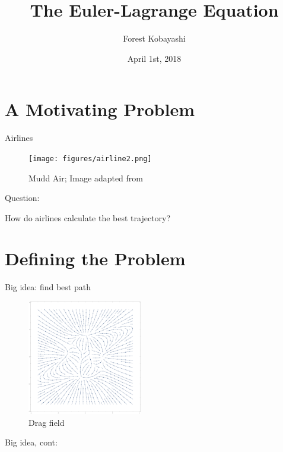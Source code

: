 \documentclass{fkpresentation}
\title{\textmd{The Euler-Lagrange Equation}}
\author{Forest Kobayashi}
\institute{Harvey Mudd College}
\date{April 1st, 2018}
\begin{document}
\frame{\titlepage}
\section{A Motivating Problem}

\begin{frame}{Airlines}
  \begin{figure}[h]
    \centering
    \texttt{[image: figures/airline2.png]}
    \caption{Mudd Air; Image adapted from \cite{Airplane}}
  \end{figure}
\end{frame}



\begin{frame}{Question:}
  \vfill
  \begin{center}
    \Huge
    How do airlines calculate the best trajectory?
  \end{center}
  \vfill
\end{frame}

\section{Defining the Problem}

\begin{frame}{Big idea: find best path}
  \begin{figure}[h]
    \centering
    \includegraphics[keepaspectratio,height=5cm]{figures/vector-field.pdf}
    \caption{Drag field}
    \label{fig:wind}
  \end{figure}
\end{frame}

\begin{frame}{Big idea, cont:}
  \begin{figure}[h]
    \vfill
    \centering
    \vfill
  \end{figure}
\end{frame}
\end{document}
